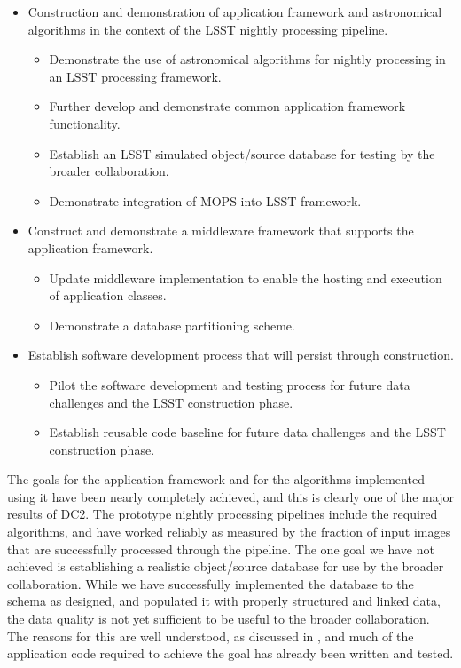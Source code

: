 \begin{itemize}
\item Construction and demonstration of application framework and
  astronomical algorithms in the context of the LSST nightly processing pipeline.
\begin{itemize}
\item Demonstrate the use of astronomical algorithms for nightly
  processing in an LSST processing framework. 
\item Further develop and demonstrate common application framework
  functionality.
\item Establish an LSST simulated object/source database for testing
  by the broader collaboration.
\item Demonstrate integration of MOPS into LSST framework. 
\end{itemize}
\item Construct and demonstrate a middleware framework that
  supports the application framework.
\begin{itemize}
\item Update middleware implementation to enable the hosting and
  execution of application classes.
\item Demonstrate a database partitioning scheme.
\end{itemize}
\item Establish software development process that will persist through construction.
\begin{itemize}
\item Pilot the software development and testing process for future data
  challenges and the LSST construction phase.
\item Establish reusable code baseline for future data challenges and
  the LSST construction phase.
\end{itemize}
\end{itemize}

The goals for the application framework and for the algorithms implemented
using it have been nearly completely achieved, and this is clearly one of
the major results of DC2.  The prototype nightly processing pipelines
include the required algorithms, and have worked reliably as measured
by the fraction of input images that are successfully processed
through the pipeline. The one goal we have not achieved is establishing
a realistic object/source database for use by the broader collaboration.
While we have successfully implemented the database to the schema as
designed, and populated it with properly structured and linked data,
the data quality is not yet sufficient to be useful to the broader
collaboration.  The reasons for this are well understood, as discussed
in , and much of the application code required
to achieve the goal has already been written and tested.

